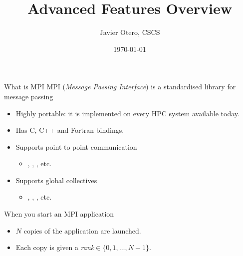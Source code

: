 \documentclass[aspectratio=43]{beamer}
\author{Javier Otero, CSCS}
\title{Advanced Features Overview}
\subtitle{}
\date{\today}
\begin{document}
\cscstitle


\begin{frame}[fragile]{What is MPI}
    MPI (\emph{Message Passing Interface}) is a standardised library for message passing
    \begin{itemize}
        \item Highly portable: it is implemented on every HPC system available today.
        \item Has C, C++ and Fortran bindings.
        \item Supports point to point communication
        \begin{itemize}
            \item {}, , , etc.
        \end{itemize}
        \item Supports global collectives
        \begin{itemize}
            \item {}, , , etc.
        \end{itemize}
    \end{itemize}
    When you start an MPI application
    \begin{itemize}
        \item $N$ copies of the application are launched.
        \item Each copy is given a \emph{rank}$\in\{0,1,\dots,N-1\}$.
    \end{itemize}
\end{frame}
\end{document}

